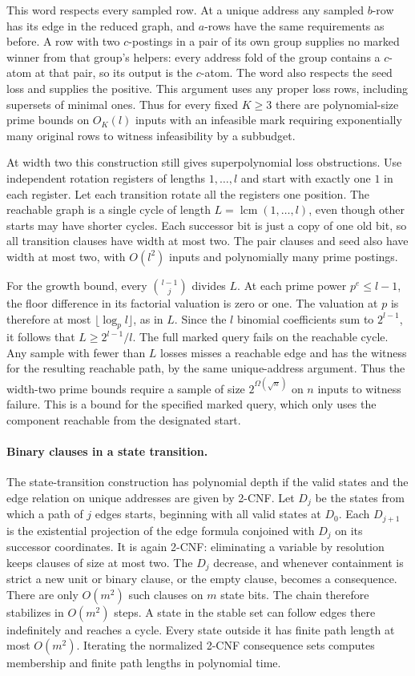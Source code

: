 This word respects every sampled row. At a
unique address any sampled $b$-row has its
edge in the reduced graph, and $a$-rows have
the same requirements as before. A row with
two $c$-postings in a pair of its own group
supplies no marked winner from that group's
helpers: every address fold of the group
contains a $c$-atom at that pair, so its
output is the $c$-atom. The word also
respects the seed loss and supplies the
positive. This argument uses any proper
loss rows, including supersets of minimal
ones. Thus for every fixed $K\ge3$ there are
polynomial-size prime bounds on $O_K(l)$
inputs with an infeasible mark requiring
exponentially many original rows to witness
infeasibility by a subbudget.

At width two this construction still gives
superpolynomial loss obstructions. Use independent
rotation registers of lengths $1,\ldots,l$ and
start with exactly one $1$ in each register.
Let each transition rotate all the registers
one position. The reachable graph is a single
cycle of length $L=\operatorname{lcm}(1,\ldots,l)$,
even though other starts may have shorter cycles.
Each successor bit is just a copy of one old bit,
so all transition clauses have width at most two.
The pair clauses and seed also have width at most
two, with $O(l^2)$ inputs and polynomially many
prime postings.

For the growth bound, every $\binom{l-1}{j}$
divides $L$. At each prime power $p^e\le l-1$,
the floor difference in its factorial valuation
is zero or one. The valuation at $p$ is therefore
at most $\lfloor\log_p l\rfloor$, as in $L$.
Since the $l$ binomial coefficients sum to
$2^{l-1}$, it follows that $L\ge2^{l-1}/l$.
The full marked query fails on the reachable
cycle. Any sample with fewer than $L$ losses
misses a reachable edge and has the witness
for the resulting reachable path, by the same
unique-address argument. Thus the width-two
prime bounds require a sample of size
$2^{\Omega(\sqrt n)}$ on $n$ inputs to witness
failure. This is a bound for the specified
marked query, which only uses the component
reachable from the designated start.

\paragraph{Binary clauses in a state transition.}
The state-transition construction has polynomial depth if the
valid states and the edge relation on unique addresses are
given by 2-CNF. Let $D_j$ be the states from which a path of
$j$ edges starts, beginning with all valid states at $D_0$.
Each $D_{j+1}$ is the existential projection of the edge formula
conjoined with $D_j$ on its successor coordinates. It is again
2-CNF: eliminating a variable by resolution keeps clauses of
size at most two. The $D_j$ decrease, and whenever containment
is strict a new unit or binary clause, or the empty clause,
becomes a consequence. There are only $O(m^2)$ such clauses
on $m$ state bits. The chain therefore stabilizes in $O(m^2)$
steps. A state in the stable set can follow edges there
indefinitely and reaches a cycle. Every state outside it has
finite path length at most $O(m^2)$. Iterating the normalized
2-CNF consequence sets computes membership and finite path
lengths in polynomial time.

